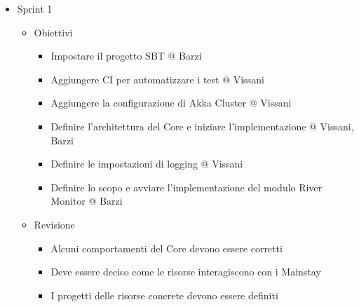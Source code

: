 \documentclass{scrartcl}
\begin{document}
\begin{itemize}
    \item Sprint 1
          \begin{itemize}
              \item Obiettivi
                    \begin{itemize}
                        \item Impostare il progetto SBT @ Barzi
                        \item Aggiungere CI per automatizzare i test @ Vissani
                        \item Aggiungere la configurazione di Akka Cluster @ Vissani
                        \item Definire l'architettura del Core e iniziare l'implementazione @ Vissani, Barzi
                        \item Definire le impostazioni di logging @ Vissani
                        \item Definire lo scopo e avviare l'implementazione del modulo River Monitor @ Barzi
                    \end{itemize}
              \item Revisione
                    \begin{itemize}
                        \item Alcuni comportamenti del Core devono essere corretti
                        \item Deve essere deciso come le risorse interagiscono con i Mainstay
                        \item I progetti delle risorse concrete devono essere definiti
                    \end{itemize}
          \end{itemize}
\end{itemize}
\end{document}
